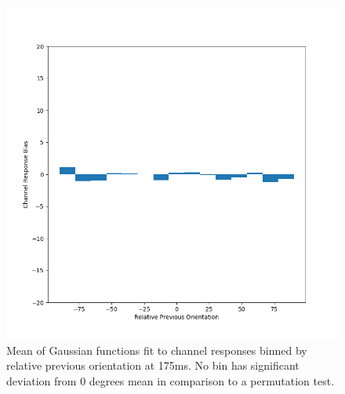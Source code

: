 \documentclass[../main.tex]{subfiles}
\begin{document}
\begin{figure}
    \centering
    \includegraphics[scale=0.7]{figures/results/sd_all_t7_v2.png}
    \caption{Mean of Gaussian functions fit to channel responses binned by relative previous orientation at 175ms. No bin has significant deviation from 0 degrees mean in comparison to a permutation test.}
    \label{sd_all_v2_t7}
\end{figure}
\end{document}
